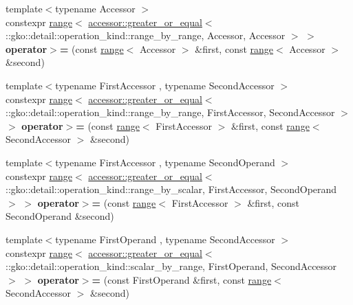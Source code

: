 \begin{DoxyCompactItemize}
\item 
\mbox{\label{namespacegko_a323744fe971b1e322b0adde873ee6fc6}} 
{\footnotesize template$<$typename Accessor $>$ }\\constexpr \hyperlink{classgko_1_1range}{range}$<$ \hyperlink{structgko_1_1accessor_1_1greater__or__equal}{accessor\+::greater\+\_\+or\+\_\+equal}$<$ \+::gko\+::detail\+::operation\+\_\+kind\+::range\+\_\+by\+\_\+range, Accessor, Accessor $>$ $>$ {\bfseries operator$>$=} (const \hyperlink{classgko_1_1range}{range}$<$ Accessor $>$ \&first, const \hyperlink{classgko_1_1range}{range}$<$ Accessor $>$ \&second)
\item 
\mbox{\label{namespacegko_a9aaf424ba6928e394060e3daee3ec841}} 
{\footnotesize template$<$typename First\+Accessor , typename Second\+Accessor $>$ }\\constexpr \hyperlink{classgko_1_1range}{range}$<$ \hyperlink{structgko_1_1accessor_1_1greater__or__equal}{accessor\+::greater\+\_\+or\+\_\+equal}$<$ \+::gko\+::detail\+::operation\+\_\+kind\+::range\+\_\+by\+\_\+range, First\+Accessor, Second\+Accessor $>$ $>$ {\bfseries operator$>$=} (const \hyperlink{classgko_1_1range}{range}$<$ First\+Accessor $>$ \&first, const \hyperlink{classgko_1_1range}{range}$<$ Second\+Accessor $>$ \&second)
\item 
\mbox{\label{namespacegko_a21e68118a9f8c4eb4c5c5d93a9a98e84}} 
{\footnotesize template$<$typename First\+Accessor , typename Second\+Operand $>$ }\\constexpr \hyperlink{classgko_1_1range}{range}$<$ \hyperlink{structgko_1_1accessor_1_1greater__or__equal}{accessor\+::greater\+\_\+or\+\_\+equal}$<$ \+::gko\+::detail\+::operation\+\_\+kind\+::range\+\_\+by\+\_\+scalar, First\+Accessor, Second\+Operand $>$ $>$ {\bfseries operator$>$=} (const \hyperlink{classgko_1_1range}{range}$<$ First\+Accessor $>$ \&first, const Second\+Operand \&second)
\item 
\mbox{\label{namespacegko_a60e5c84356708a0ee714198c211118d7}} 
{\footnotesize template$<$typename First\+Operand , typename Second\+Accessor $>$ }\\constexpr \hyperlink{classgko_1_1range}{range}$<$ \hyperlink{structgko_1_1accessor_1_1greater__or__equal}{accessor\+::greater\+\_\+or\+\_\+equal}$<$ \+::gko\+::detail\+::operation\+\_\+kind\+::scalar\+\_\+by\+\_\+range, First\+Operand, Second\+Accessor $>$ $>$ {\bfseries operator$>$=} (const First\+Operand \&first, const \hyperlink{classgko_1_1range}{range}$<$ Second\+Accessor $>$ \&second)

\end{DoxyCompactItemize}
